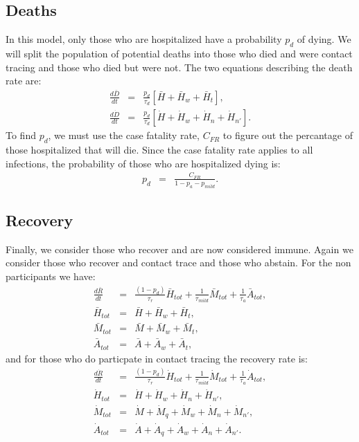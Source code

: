 \documentclass[notitlepage, superscriptaddress]{revtex4-2}
\begin{document}
\subsection{Deaths}
In this model, only those who are hospitalized have a probability $p_{d}$ of dying. We will split the population of potential deaths into those who died and were contact tracing and those who died but were not. The two equations describing the death rate are:
\begin{eqnarray}
\frac{d\bar{D}}{dt} &=& \frac{p_{d}}{\tau_{d}} \left[ \bar{H} + \bar{H}_{w} + \bar{H}_{t}   \right], \\ 
\frac{d\dot{D}}{dt} &=& \frac{p_{d}}{\tau_{d}} \left[ \dot{H} + \dot{H}_{w} + \dot{H}_{n} + \dot{H}_{n'}   \right].
\end{eqnarray}
To find $p_{d}$, we must use the case fatality rate, $C_{FR}$ to figure out the percantage of those hospitalized that will die. Since the case fatality rate applies to all infections, the probability of those who are hospitalized dying is:
\begin{eqnarray}
p_{d} &=& \frac{C_{FR}}{1- p_{a} - p_{mild}}.
\end{eqnarray}

\subsection{Recovery}
Finally, we consider those who recover and are now considered immune. Again we consider those who recover and contact trace and those who abstain. For the non participants we have:
\begin{eqnarray}
\frac{d\bar{R}}{dt} &=& \frac{(1 - p_{d})}{\tau_{r}} \bar{H}_{tot} + \frac{1}{\tau_{mild}} \bar{M}_{tot} + \frac{1}{\tau_{a}} \bar{A}_{tot}, \\
\bar{H}_{tot} &=&  \bar{H} + \bar{H}_{w} + \bar{H}_{t} , \\
\bar{M}_{tot} &=&  \bar{M} + \bar{M}_{w} + \bar{M}_{t}, \\
\bar{A}_{tot} &=&  \bar{A} + \bar{A}_{w} + \bar{A}_{t},  
\end{eqnarray}
and for those who do particpate in contact tracing the recovery rate is:
\begin{eqnarray}
\frac{d\dot{R}}{dt} &=& \frac{(1 - p_{d})}{\tau_{r}} \dot{H}_{tot} + \frac{1}{\tau_{mild}} \dot{M}_{tot} + \frac{1}{\tau_{a}} \dot{A}_{tot}, \\
\dot{H}_{tot} &=&  \dot{H} + \dot{H}_{w} + \dot{H}_{n} + \dot{H}_{n'} , \\
\dot{M}_{tot} &=&  \dot{M} + \dot{M}_{q} + \dot{M}_{w} + \dot{M}_{n} + \dot{M}_{n'}, \\
\dot{A}_{tot} &=&  \dot{A} + \dot{A}_{q} + \dot{A}_{w} + \dot{A}_{n} + \dot{A}_{n'}. 
\end{eqnarray}
\end{document}
